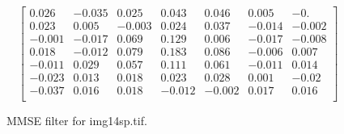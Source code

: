 \documentclass{article}
\begin{document}
\begin{figure}[H]
    \begin{equation*}
        \begin{bmatrix}
        0.026 & -0.035 & 0.025 & 0.043 & 0.046 & 0.005 & -0.\\
        0.023 & 0.005 & -0.003 & 0.024 & 0.037 & -0.014 & -0.002\\
        -0.001 & -0.017 & 0.069 & 0.129 & 0.006 & -0.017 & -0.008\\
        0.018 & -0.012 & 0.079 & 0.183 & 0.086 & -0.006 & 0.007\\
        -0.011 & 0.029 & 0.057 & 0.111 & 0.061 & -0.011 & 0.014\\
        -0.023 & 0.013 & 0.018 & 0.023 & 0.028 & 0.001 & -0.02\\
        -0.037 & 0.016 & 0.018 & -0.012 & -0.002 & 0.017 & 0.016\\
        \end{bmatrix}
    \end{equation*}
\caption{MMSE filter for img14sp.tif.}
\end{figure}
\end{document}
